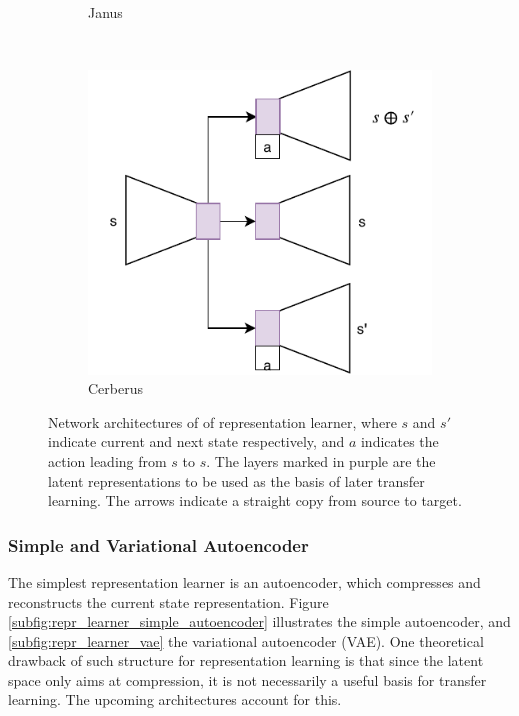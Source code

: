 \begin{figure}[ht!]
\begin{subfigure}{0.5\columnwidth}
		\caption{Janus}
		\label{subfig:repr_learner_janus}
	\end{subfigure}%
	~ 
	\begin{subfigure}{0.5\columnwidth}
		\centering
		\includegraphics[width=\linewidth]{../img/cerberus.pdf}
		\caption{Cerberus}
		\label{subfig:repr_learner_cerberus}
	\end{subfigure}
	\caption{Network architectures of of representation learner, where $s$ and $s'$ indicate current and next state respectively, and $a$ indicates the action leading from $s$ to $s$. 
	The layers marked in purple are the latent representations to be used as the basis of later transfer learning. 
	The arrows indicate a straight copy from source to target.
	}
	\label{fig:repr_learner}
\end{figure}

\subsubsection{Simple and Variational Autoencoder}
The simplest representation learner is an autoencoder, which compresses and reconstructs the current state representation. 
Figure \ref{subfig:repr_learner_simple_autoencoder} illustrates the simple autoencoder, and \ref{subfig:repr_learner_vae} the variational autoencoder (VAE). 
One theoretical drawback of such structure for representation learning is that
since the latent space only aims at compression, it is not necessarily a useful basis for transfer learning.
The upcoming architectures account for this.

